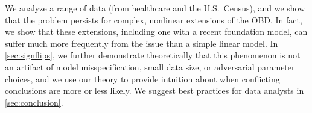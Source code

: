 We analyze a range of data (from healthcare and the U.S.\ Census), and we show that the problem persists for complex, nonlinear extensions of the OBD.
In fact, we show that these extensions, including one with a recent foundation model, can suffer much more frequently from the issue than
a simple linear model.
In \cref{sec:signflips}, we further demonstrate theoretically that this phenomenon is not an artifact of 
model misspecification, small data size, or adversarial parameter choices, and we use our theory to provide intuition about when conflicting conclusions are more or less likely.
We suggest best practices for data analysts in \cref{sec:conclusion}.












